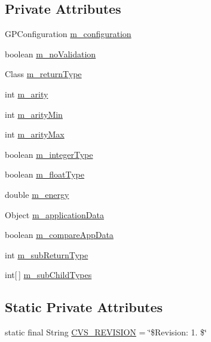 \subsection*{Private Attributes}
\begin{DoxyCompactItemize}
\item 
G\-P\-Configuration \hyperlink{classorg_1_1jgap_1_1gp_1_1_command_gene_a6ae8e74ae5261a7e70b8879dec8eac96}{m\-\_\-configuration}
\item 
boolean \hyperlink{classorg_1_1jgap_1_1gp_1_1_command_gene_a843747066fa55788301f6205267f4e92}{m\-\_\-no\-Validation}
\item 
Class \hyperlink{classorg_1_1jgap_1_1gp_1_1_command_gene_a8f12f97706af7a21c916ca10c24b9ef6}{m\-\_\-return\-Type}
\item 
int \hyperlink{classorg_1_1jgap_1_1gp_1_1_command_gene_a951edb6bc5891e6a1dd2a58aab9c7b58}{m\-\_\-arity}
\item 
int \hyperlink{classorg_1_1jgap_1_1gp_1_1_command_gene_a33531c47c9faca001b4fe1a82bd0d177}{m\-\_\-arity\-Min}
\item 
int \hyperlink{classorg_1_1jgap_1_1gp_1_1_command_gene_aa47dae1c5b5af003cfad3d3aaf1acfaa}{m\-\_\-arity\-Max}
\item 
boolean \hyperlink{classorg_1_1jgap_1_1gp_1_1_command_gene_a9cc9f83eef23abb125cc812b386e40a1}{m\-\_\-integer\-Type}
\item 
boolean \hyperlink{classorg_1_1jgap_1_1gp_1_1_command_gene_a7e302c9b5bd345bb9effeb6feccdd439}{m\-\_\-float\-Type}
\item 
double \hyperlink{classorg_1_1jgap_1_1gp_1_1_command_gene_a20b190feb9710d390ee59cbd30386c95}{m\-\_\-energy}
\item 
Object \hyperlink{classorg_1_1jgap_1_1gp_1_1_command_gene_a454ff64d5021d90fcd1ecc879bddfc82}{m\-\_\-application\-Data}
\item 
boolean \hyperlink{classorg_1_1jgap_1_1gp_1_1_command_gene_ae1553ab72b757d9999f3556d7ed187ba}{m\-\_\-compare\-App\-Data}
\item 
int \hyperlink{classorg_1_1jgap_1_1gp_1_1_command_gene_a8fb8742b3f1740df8a71bf96619b5372}{m\-\_\-sub\-Return\-Type}
\item 
int\mbox{[}$\,$\mbox{]} \hyperlink{classorg_1_1jgap_1_1gp_1_1_command_gene_a0048389afa8d081b56e5b00d1eee343e}{m\-\_\-sub\-Child\-Types}
\end{DoxyCompactItemize}
\subsection*{Static Private Attributes}
\begin{DoxyCompactItemize}
\item 
static final String \hyperlink{classorg_1_1jgap_1_1gp_1_1_command_gene_aff4fea0f4d150814aa1659c457d0401c}{C\-V\-S\-\_\-\-R\-E\-V\-I\-S\-I\-O\-N} = \char`\"{}\$Revision\-: 1. \$\char`\"{}
\end{DoxyCompactItemize}


